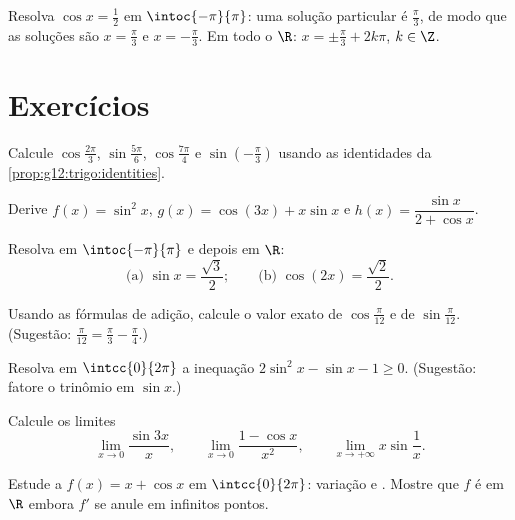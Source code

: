\begin{example}\label{ex:g12:trigo:equation}
Resolva $\cos x = \frac12$ em $\intoc{-\pi}{\pi}$: uma solução particular é
$\frac\pi3$, de modo que as soluções são $x = \frac\pi3$ e
$x = -\frac\pi3$. Em todo o $\R$: $x = \pm\frac\pi3 + 2k\pi$, $k \in \Z$.
\end{example}

\section{Exercícios}

\begin{exercise}[$\star$]\label{exo:g12:trigo:1}
Calcule $\cos\frac{2\pi}{3}$, $\sin\frac{5\pi}{6}$, $\cos\frac{7\pi}{4}$ e
$\sin\left(-\frac{\pi}{3}\right)$ usando as identidades da
\cref{prop:g12:trigo:identities}.
\end{exercise}

\begin{exercise}[$\star$]\label{exo:g12:trigo:2}
Derive $f(x) = \sin^2 x$, $g(x) = \cos(3x) + x\sin x$ e
$h(x) = \dfrac{\sin x}{2 + \cos x}$.
\end{exercise}

\begin{exercise}[$\star$]\label{exo:g12:trigo:3}
Resolva em $\intoc{-\pi}{\pi}$ e depois em $\R$:
\[
\text{(a) } \sin x = \frac{\sqrt3}{2};
\qquad
\text{(b) } \cos\left(2x\right) = \frac{\sqrt2}{2} .
\]
\end{exercise}

\begin{exercise}[$\star\star$]\label{exo:g12:trigo:4}
Usando as fórmulas de adição, calcule o valor exato de
$\cos\frac{\pi}{12}$ e de $\sin\frac{\pi}{12}$. (Sugestão:
$\frac{\pi}{12} = \frac{\pi}{3} - \frac{\pi}{4}$.)
\end{exercise}

\begin{exercise}[$\star\star$]\label{exo:g12:trigo:5}
Resolva em $\intcc{0}{2\pi}$ a inequação $2\sin^2 x - \sin x - 1 \geq 0$.
(Sugestão: fatore o trinômio em $\sin x$.)
\end{exercise}

\begin{exercise}[$\star\star$]\label{exo:g12:trigo:6}
Calcule os limites
\[
\lim_{x\to0} \frac{\sin 3x}{x}, \qquad
\lim_{x\to0} \frac{1 - \cos x}{x^2}, \qquad
\lim_{x\to+\infty} x \sin\frac{1}{x}.
\]
\end{exercise}

\begin{exercise}[$\star\star$]\label{exo:g12:trigo:7}
Estude a  $f(x) = x + \cos x$ em $\intcc{0}{2\pi}$: variação e
. Mostre que $f$ é  em $\R$ embora $f'$ se anule em
infinitos pontos.
\end{exercise}

